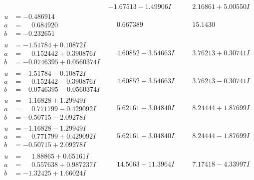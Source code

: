 \documentclass[1p]{elsarticle_modified}
\theoremstyle{definition}
\begin{document}
$$\begin{array}{c|c|c}
 & -1.67513 - 1.49906 I & \phantom{-}2.16861 + 5.00550 I \\ \hline\begin{aligned}
u &= -0.486914\phantom{ +0.000000I} \\
a &= \phantom{-}0.684920\phantom{ +0.000000I} \\
b &= -0.232651\phantom{ +0.000000I}\end{aligned}
 & \phantom{-}0.667389\phantom{ +0.000000I} & \phantom{-}15.1430\phantom{ +0.000000I} \\ \hline\begin{aligned}
u &= -1.51784 + 0.10872 I \\
a &= \phantom{-}0.152442 + 0.390876 I \\
b &= -0.0746395 + 0.0560374 I\end{aligned}
 & \phantom{-}4.60852 - 3.54663 I & \phantom{-}3.76213 + 0.30741 I \\ \hline\begin{aligned}
u &= -1.51784 - 0.10872 I \\
a &= \phantom{-}0.152442 - 0.390876 I \\
b &= -0.0746395 - 0.0560374 I\end{aligned}
 & \phantom{-}4.60852 + 3.54663 I & \phantom{-}3.76213 - 0.30741 I \\ \hline\begin{aligned}
u &= -1.16828 + 1.29949 I \\
a &= \phantom{-}0.771799 - 0.429092 I \\
b &= -0.50715 - 2.09278 I\end{aligned}
 & \phantom{-}5.62161 - 3.04840 I & \phantom{-}8.24444 + 1.87699 I \\ \hline\begin{aligned}
u &= -1.16828 - 1.29949 I \\
a &= \phantom{-}0.771799 + 0.429092 I \\
b &= -0.50715 + 2.09278 I\end{aligned}
 & \phantom{-}5.62161 + 3.04840 I & \phantom{-}8.24444 - 1.87699 I \\ \hline\begin{aligned}
u &= \phantom{-}1.88865 + 0.65161 I \\
a &= \phantom{-}0.557638 + 0.987237 I \\
b &= -1.32425 + 1.66024 I\end{aligned}
 & \phantom{-}14.5063 + 11.3964 I & \phantom{-}7.17418 - 4.33997 I \\ \hline\begin{aligned}

\end{aligned}
\end{array}$$
\end{document}
